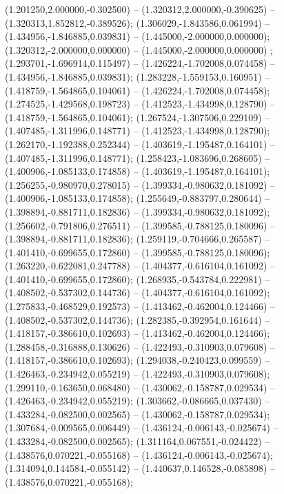  (1.201250,2.000000,-0.302500) -- (1.320312,2.000000,-0.390625) -- (1.320313,1.852812,-0.389526);
 (1.306029,-1.843586,0.061994) -- (1.434956,-1.846885,0.039831) -- (1.445000,-2.000000,0.000000);
 (1.320312,-2.000000,0.000000) -- (1.445000,-2.000000,0.000000) ;
 (1.293701,-1.696914,0.115497) -- (1.426224,-1.702008,0.074458) -- (1.434956,-1.846885,0.039831);
 (1.283228,-1.559153,0.160951) -- (1.418759,-1.564865,0.104061) -- (1.426224,-1.702008,0.074458);
 (1.274525,-1.429568,0.198723) -- (1.412523,-1.434998,0.128790) -- (1.418759,-1.564865,0.104061);
 (1.267524,-1.307506,0.229109) -- (1.407485,-1.311996,0.148771) -- (1.412523,-1.434998,0.128790);
 (1.262170,-1.192388,0.252344) -- (1.403619,-1.195487,0.164101) -- (1.407485,-1.311996,0.148771);
 (1.258423,-1.083696,0.268605) -- (1.400906,-1.085133,0.174858) -- (1.403619,-1.195487,0.164101);
 (1.256255,-0.980970,0.278015) -- (1.399334,-0.980632,0.181092) -- (1.400906,-1.085133,0.174858);
 (1.255649,-0.883797,0.280644) -- (1.398894,-0.881711,0.182836) -- (1.399334,-0.980632,0.181092);
 (1.256602,-0.791806,0.276511) -- (1.399585,-0.788125,0.180096) -- (1.398894,-0.881711,0.182836);
 (1.259119,-0.704666,0.265587) -- (1.401410,-0.699655,0.172860) -- (1.399585,-0.788125,0.180096);
 (1.263220,-0.622081,0.247788) -- (1.404377,-0.616104,0.161092) -- (1.401410,-0.699655,0.172860);
 (1.268935,-0.543784,0.222981) -- (1.408502,-0.537302,0.144736) -- (1.404377,-0.616104,0.161092);
 (1.275833,-0.468529,0.192573) -- (1.413462,-0.462004,0.124466) -- (1.408502,-0.537302,0.144736);
 (1.282385,-0.392954,0.161644) -- (1.418157,-0.386610,0.102693) -- (1.413462,-0.462004,0.124466);
 (1.288458,-0.316888,0.130626) -- (1.422493,-0.310903,0.079608) -- (1.418157,-0.386610,0.102693);
 (1.294038,-0.240423,0.099559) -- (1.426463,-0.234942,0.055219) -- (1.422493,-0.310903,0.079608);
 (1.299110,-0.163650,0.068480) -- (1.430062,-0.158787,0.029534) -- (1.426463,-0.234942,0.055219);
 (1.303662,-0.086665,0.037430) -- (1.433284,-0.082500,0.002565) -- (1.430062,-0.158787,0.029534);
 (1.307684,-0.009565,0.006449) -- (1.436124,-0.006143,-0.025674) -- (1.433284,-0.082500,0.002565);
 (1.311164,0.067551,-0.024422) -- (1.438576,0.070221,-0.055168) -- (1.436124,-0.006143,-0.025674);
 (1.314094,0.144584,-0.055142) -- (1.440637,0.146528,-0.085898) -- (1.438576,0.070221,-0.055168);

